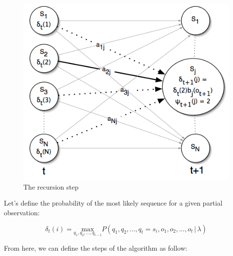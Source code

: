 \begin{figure}[!ht]
	\centering
	\includegraphics[scale=0.8]{Figures/hmm_recursion.png}
	\caption{The recursion step \cite{hmm_tutorial}}
	\label{fig:hmm_recursion}
\end{figure}

\noindent Let's define the probability of the most likely sequence for a given partial observation: 

\begin{equation}
	\delta_{t}(i) =  \underset{q_{1},q_{2}, ... , q_{t-1}}{\mathrm{max}} P (q_{1},q_{2}, ... , q_{t} = s_{i}, o_{1}, o_{2}, ... , o_{t} \, | \, \lambda)
\end{equation}

\noindent From here, we can define the steps of the algorithm as follow:

